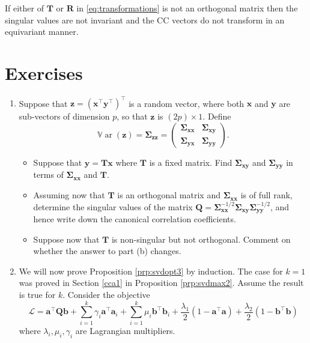 \documentclass[]{book}
\providecommand{\tightlist}{%
  \setlength{\itemsep}{0pt}\setlength{\parskip}{0pt}}
\theoremstyle{definition}
\theoremstyle{definition}
\theoremstyle{definition}
\theoremstyle{remark}
\begin{document}
If either of \(\mathbf T\) or \(\mathbf R\) in \eqref{eq:transformations} is not an orthogonal matrix then the singular values are not invariant and the CC vectors do not transform in an equivariant manner.

\hypertarget{exercises-2}{%
\section{Exercises}\label{exercises-2}}

\begin{enumerate}
\def\labelenumi{\arabic{enumi}.}
\tightlist
\item
  Suppose that \(\boldsymbol z= (\boldsymbol x^\top \boldsymbol y^\top)^\top\) is a random vector, where both \(\boldsymbol x\) and \(\boldsymbol y\) are sub-vectors of dimension \(p\), so that \(\boldsymbol z\) is \((2p)\times 1\). Define
  \[{\mathbb{V}\operatorname{ar}}(\boldsymbol z)=\boldsymbol \Sigma_{\boldsymbol z\boldsymbol z}=\begin{pmatrix} \boldsymbol \Sigma_{\boldsymbol x\boldsymbol x} & \boldsymbol \Sigma_{\boldsymbol x\boldsymbol y}\\\boldsymbol \Sigma_{\boldsymbol y\boldsymbol x} & \boldsymbol \Sigma_{\boldsymbol y\boldsymbol y}  \end{pmatrix}.\]

  \begin{itemize}
  \tightlist
  \item
    Suppose that \(\boldsymbol y= \boldsymbol T\boldsymbol x\) where \(\boldsymbol T\) is a fixed matrix. Find \(\boldsymbol \Sigma_{\boldsymbol x\boldsymbol y}\) and \(\boldsymbol \Sigma_{\boldsymbol y\boldsymbol y}\) in terms of \(\boldsymbol \Sigma_{\boldsymbol x\boldsymbol x}\) and \(\boldsymbol T\).
  \item
    Assuming now that \(\boldsymbol T\) is an orthogonal matrix and \(\boldsymbol \Sigma_{\boldsymbol x\boldsymbol x}\) is of full rank, determine the singular values of the matrix \(\boldsymbol Q=\boldsymbol \Sigma_{\boldsymbol x\boldsymbol x}^{-1/2}\boldsymbol \Sigma_ {\boldsymbol x\boldsymbol y}\boldsymbol \Sigma_{\boldsymbol y\boldsymbol y}^{-1/2}\), and hence write down the canonical correlation coefficients.
  \item
    Suppose now that \(\boldsymbol T\) is non-singular but not orthogonal. Comment on whether the answer to part (b) changes.
  \end{itemize}
\item
  We will now prove Proposition \ref{prp:svdopt3} by induction.
  The case for \(k=1\) was proved in Section \ref{cca1} in Proposition \ref{prp:svdmax2}. Assume the result is true for \(k\). Consider the objective
  \[\mathcal{L} = \boldsymbol a^\top \boldsymbol Q\boldsymbol b+ \sum_{i=1}^k \gamma_i\boldsymbol a^\top \boldsymbol a_i + \sum_{i=1}^k \mu_i\boldsymbol b^\top \boldsymbol b_i + \frac{\lambda_1}{2}(1-\boldsymbol a^\top\boldsymbol a)+ \frac{\lambda_2}{2}(1-\boldsymbol b^\top\boldsymbol b)\]
  where \(\lambda_i, \mu_i, \gamma_i\) are Lagrangian multipliers.


\end{enumerate}
\end{document}
